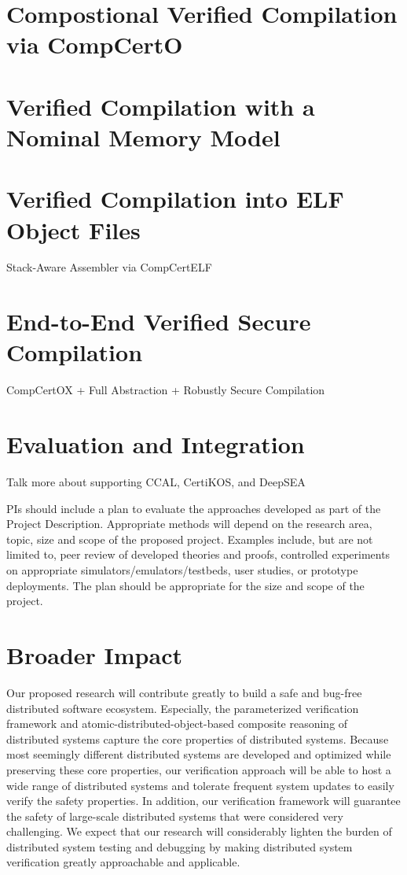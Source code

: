 \documentclass[11pt]{article}
\begin{document}
\section{Compostional Verified Compilation via CompCertO}

\section{Verified Compilation with a Nominal Memory Model}

\section{Verified Compilation into ELF Object Files}

Stack-Aware Assembler via CompCertELF

\section{End-to-End Verified Secure Compilation}

CompCertOX + Full Abstraction + Robustly Secure Compilation
    
\section{Evaluation and Integration}

Talk more about supporting CCAL, CertiKOS, and DeepSEA

PIs should include a plan to evaluate the approaches developed as part
of the Project Description. Appropriate methods will depend on the
research area, topic, size and scope of the proposed project. Examples
include, but are not limited to, peer review of developed theories and
proofs, controlled experiments on appropriate
simulators/emulators/testbeds, user studies, or prototype
deployments. The plan should be appropriate for the size and scope of
the project.


\section{Broader Impact}

Our proposed research will contribute greatly to build a safe and
bug-free distributed software ecosystem. Especially, the parameterized
verification framework and atomic-distributed-object-based composite
reasoning of distributed systems capture the core properties of
distributed systems. Because most seemingly different distributed
systems are developed and optimized while preserving these core
properties, our verification approach will be able to host a wide
range of distributed systems and tolerate frequent system updates to
easily verify the safety properties. In addition, our verification
framework will guarantee the safety of large-scale distributed systems
that were considered very challenging. We expect that our research
will considerably lighten the burden of distributed system testing and
debugging by making distributed system verification greatly
approachable and applicable.
\end{document}
